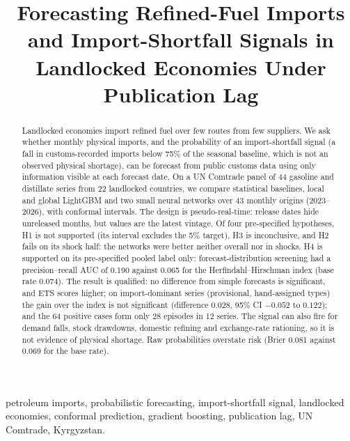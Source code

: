 \documentclass[conference]{IEEEtran}
\begin{document}
\title{Forecasting Refined-Fuel Imports and Import-Shortfall Signals in Landlocked Economies Under Publication Lag}

\author{
}

\maketitle

\begin{abstract}
Landlocked economies import refined fuel over few routes from few suppliers. We ask whether monthly physical imports, and the probability of an import-shortfall signal (a fall in customs-recorded imports below 75\% of the seasonal baseline, which is not an observed physical shortage), can be forecast from public customs data using only information visible at each forecast date. On a UN Comtrade panel of 44 gasoline and distillate series from 22 landlocked countries, we compare statistical baselines, local and global LightGBM and two small neural networks over 43 monthly origins (2023--2026), with conformal intervals. The design is pseudo-real-time: release dates hide unreleased months, but values are the latest vintage. Of four pre-specified hypotheses, H1 is not supported (its interval excludes the 5\% target), H3 is inconclusive, and H2 fails on its shock half: the networks were better neither overall nor in shocks. H4 is supported on its pre-specified pooled label only: forecast-distribution screening had a precision--recall AUC of 0.190 against 0.065 for the Herfindahl--Hirschman index (base rate 0.074). The result is qualified: no difference from simple forecasts is significant, and ETS scores higher; on import-dominant series (provisional, hand-assigned types) the gain over the index is not significant (difference 0.028, 95\% CI $-0.052$ to $0.122$); and the 64 positive cases form only 28 episodes in 12 series. The signal can also fire for demand falls, stock drawdowns, domestic refining and exchange-rate rationing, so it is not evidence of physical shortage. Raw probabilities overstate risk (Brier 0.081 against 0.069 for the base rate).
\end{abstract}

\begin{IEEEkeywords}
petroleum imports, probabilistic forecasting, import-shortfall signal, landlocked economies, conformal prediction, gradient boosting, publication lag, UN Comtrade, Kyrgyzstan.
\end{IEEEkeywords}
\end{document}
